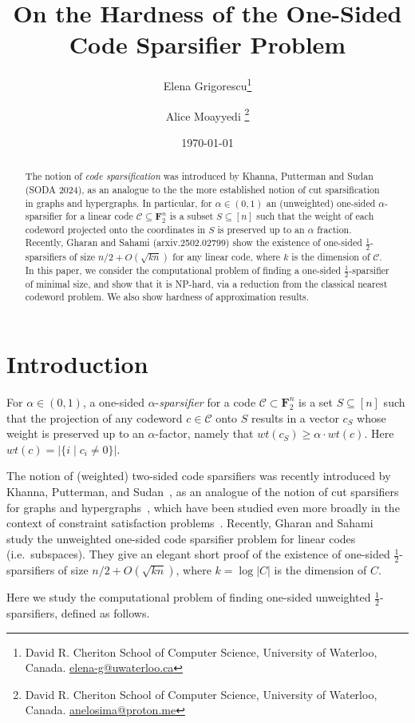 \documentclass{article}
\title{On the Hardness of the One-Sided Code Sparsifier Problem}
\date{\today}
\author{
Elena Grigorescu\thanks{David R. Cheriton School of Computer Science, 
University of Waterloo, Canada. 
 \url{elena-g@uwaterloo.ca}} 
\and
Alice Moayyedi \thanks{David R. Cheriton School of Computer Science, 
University of Waterloo, Canada. 
\url{anelosima@proton.me}}}
\newcommand{\FF}{\mathbf{F}}
\newcommand{\calC}{\mathcal{C}}
\begin{document}
\maketitle

\begin{abstract}
    The notion of \emph{code sparsification} was introduced by Khanna, Putterman and Sudan (SODA 2024), as an analogue to the the more established notion of cut sparsification in graphs and hypergraphs. In particular, for $\alpha\in (0,1)$ an (unweighted) one-sided $\alpha$-sparsifier for a linear code $\calC \subseteq \FF_2^n$ is a subset $S\subseteq [n]$ such that the weight of each codeword projected onto the coordinates in $S$ is preserved up to an $\alpha$ fraction.  Recently, Gharan and Sahami (arxiv.2502.02799) show the existence of one-sided $\frac12$-sparsifiers of size $n/2+O(\sqrt{kn})$ for any linear code,  where $k$ is the dimension of $\calC$. In this paper, we consider the computational problem of finding a one-sided $\frac12$-sparsifier of minimal size, and show that it is NP-hard, via a reduction from the classical nearest codeword problem. We also show hardness of approximation results.
\end{abstract}

\section{Introduction}\label{sec:intro}

For $\alpha\in (0,1)$, a one-sided $\alpha$-\emph{sparsifier} for a code $\calC \subset \FF_2^n$ is a set $S\subseteq [n]$ such that the projection of any codeword $c \in \calC$ onto $S$ results in a vector $c_S$ whose weight is preserved up to an $\alpha$-factor, namely that $wt(c_S)\geq \alpha \cdot wt(c)$. Here $wt(c)=|\{i \mid c_i\ne 0\}|$.

The notion of (weighted) two-sided code sparsifiers was recently introduced by Khanna, Putterman, and Sudan~\cite{KhannaPS24}, as an analogue of the notion of cut sparsifiers for graphs and hypergraphs~\cite{Karger94}, which have been studied even more broadly in the context of constraint satisfaction problems~\cite{KoganK15}. Recently, Gharan and Sahami~\cite{GharanSahami2025} study the unweighted one-sided code sparsifier problem for linear codes (i.e.\ subspaces). They give an elegant short proof of the existence of one-sided $\frac12$-sparsifiers of size $n/2+O(\sqrt{kn})$, where $k=\log|C|$ is the dimension of $C$.

Here we study the computational problem of finding one-sided unweighted $\frac12$-sparsifiers, defined as follows.
\end{document}
